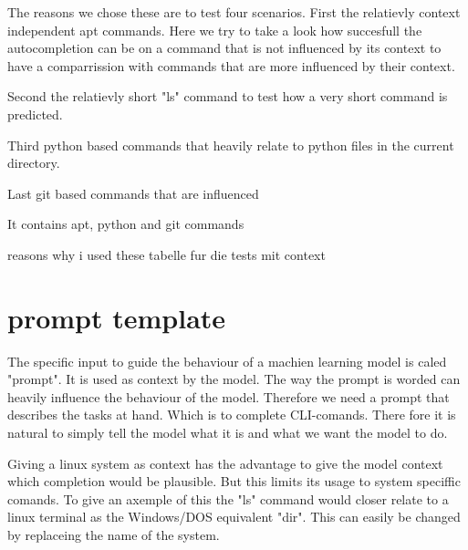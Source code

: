 The reasons we chose these are to test four scenarios. First the relatievly context independent apt commands. Here we try to take a look how succesfull the autocompletion can be on a command that is not influenced by its context to have a comparrission with commands that are more influenced by their context.

Second the relatievly short "ls" command to test how a very short command is predicted.

Third python based commands that heavily relate to python files in the current directory. 


Last git based commands that are influenced 



It contains apt, python and git commands

reasons why i used these
tabelle fur die tests mit context

\section{prompt template}


The specific input to guide the behaviour of a machien learning model is caled "prompt". It is used as context by the model. The way the prompt is worded can heavily influence the behaviour of the model. Therefore we need a prompt that describes the tasks at hand. Which is to complete CLI-comands. There fore it is natural to simply tell the model what it is and what we want the model to do. 


Giving a linux system as context has the advantage to give the model context which completion would be plausible. 
But this limits its usage to system speciffic comands. To give an axemple of this the "ls" command would closer relate to  a linux terminal as the Windows/DOS equivalent "dir". This can easily be changed by replaceing the name of the system.






